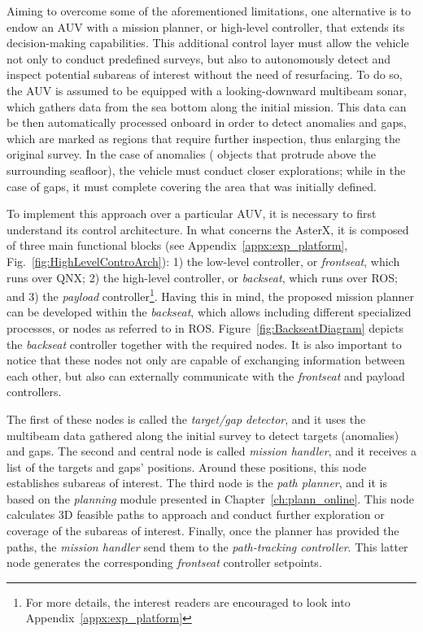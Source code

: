 Aiming to overcome some of the aforementioned limitations, one alternative is to
endow an \ac{AUV} with a mission planner, or high-level controller, that extends
its decision-making capabilities. This additional control layer must allow the
vehicle not only to conduct predefined surveys, but also to autonomously detect
and inspect potential subareas of interest without the need of resurfacing. To
do so, the \ac{AUV} is assumed to be equipped with a looking-downward
multibeam sonar, which gathers data from the sea bottom along the initial
mission. This data can be then automatically processed onboard in order to
detect anomalies and gaps, which are marked as regions that require further
inspection, thus enlarging the original survey. In the case of anomalies (\ie
objects that protrude above the surrounding seafloor), the vehicle must conduct
closer explorations; while in the case of gaps, it must complete covering the
area that was initially defined.

To implement this approach over a particular \ac{AUV}, it is necessary to first
understand its control architecture. In what concerns the AsterX, it is composed
of three main functional blocks (see Appendix~\ref{appx:exp_platform},
Fig.~\ref{fig:HighLevelControArch}): 1) the low-level controller, or
\textit{frontseat}, which runs over QNX; 2) the high-level controller, or
\textit{backseat}, which runs over \acf{ROS}; and 3) the \textit{payload}
controller\footnote{For more details, the interest readers are encouraged to
look into Appendix~\ref{appx:exp_platform}}. Having this in mind, the proposed
mission planner can be developed within the \textit{backseat}, which allows
including different specialized processes, or nodes as referred to in
\ac{ROS}. Figure~\ref{fig:BackseatDiagram} depicts the \textit{backseat}
controller together with the required nodes. It is also important to notice that
these nodes not only are capable of exchanging information between each other,
but also can externally communicate with the \textit{frontseat} and payload
controllers.

The first of these nodes is called the \textit{target/gap detector}, and it uses
the multibeam data gathered along the initial survey to detect targets
(anomalies) and gaps. The second and central node is called \textit{mission
handler}, and it receives a list of the targets and gaps' positions. Around
these positions, this node establishes subareas of interest. The third node is
the \textit{path planner}, and it is based on the \textit{planning} module
presented in Chapter~\ref{ch:plann_online}. This node calculates \ac{3D}
feasible paths to approach and conduct further exploration or coverage of the
subareas of interest. Finally, once the planner has provided the paths, the
\textit{mission handler} send them to the \textit{path-tracking controller}.
This latter node generates the corresponding \textit{frontseat} controller
setpoints.

